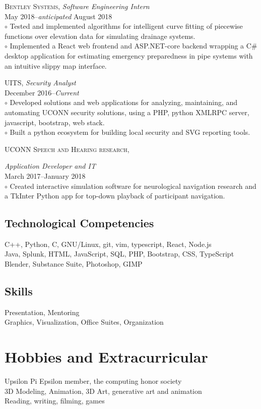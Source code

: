 \documentclass[Letterpaper,11pt]{article}
\begin{document}
    \textsc{Bentley Systems}, 
    \textit{Software Engineering Intern}\\
    May 2018--\textit{anticipated} August 2018\\
        $\circ$ Tested and implemented algorithms for intelligent curve fitting of piecewise functions over elevation data for simulating drainage systems.
        \\
        $\circ$ Implemented a React web frontend and ASP.NET-core backend wrapping a C# desktop application for estimating emergency preparedness in pipe systems with an intuitive slippy map interface.

    \textsc{UITS}, 
    \textit{Security Analyst}\\
    December 2016--\textit{Current}\\
        $\circ$ Developed solutions and web applications for analyzing, maintaining, and automating UCONN security solutions, using a PHP, python XMLRPC server, javascript, bootstrap, web stack.
        \\
        $\circ$ Built a python ecosystem for building local security and SVG reporting tools.

    \textsc{UCONN Speech and Hearing research}, 

    \textit{Application Developer and IT}\\
    March 2017--January 2018\\
        $\circ$ Created interactive simulation software for neurological navigation research and a TkInter Python app for top-down playback of participant navigation. 
        
\begin{multicols}{2}

    \subsection*{Technological Competencies}
    
        C++, Python, C, GNU/Linux, git, vim, typescript, React, Node.js
        \\
        Java, Splunk, HTML, JavaScript, SQL, PHP, Bootstrap, CSS, TypeScript
        \\
        Blender, Substance Suite, Photoshop, GIMP
    
    \subsection*{Skills}
    
        Presentation, Mentoring\\
        Graphics, Visualization, Office Suites, Organization\\
    
\end{multicols}

\section*{Hobbies and Extracurricular}

    Upsilon Pi Epsilon member, the computing honor society\\
    3D Modeling, Animation, 3D Art, generative art and animation\\
    Reading, writing, filming, games
    
\clearpage
\end{document}
